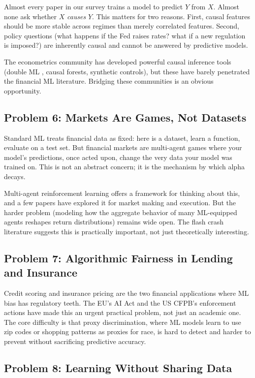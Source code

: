 Almost every paper in our survey trains a model to predict $Y$ from $X$. Almost none ask whether $X$ \textit{causes} $Y$. This matters for two reasons. First, causal features should be more stable across regimes than merely correlated features. Second, policy questions (what happens if the Fed raises rates? what if a new regulation is imposed?) are inherently causal and cannot be answered by predictive models.

The econometrics community has developed powerful causal inference tools (double ML \citep{Chernozhukov2018}, causal forests, synthetic controls), but these have barely penetrated the financial ML literature. Bridging these communities is an obvious opportunity.

\subsection{Problem 6: Markets Are Games, Not Datasets}

Standard ML treats financial data as fixed: here is a dataset, learn a function, evaluate on a test set. But financial markets are multi-agent games where your model's predictions, once acted upon, change the very data your model was trained on. This is not an abstract concern; it is the mechanism by which alpha decays.

Multi-agent reinforcement learning offers a framework for thinking about this, and a few papers have explored it for market making and execution. But the harder problem (modeling how the aggregate behavior of many ML-equipped agents reshapes return distributions) remains wide open. The flash crash literature suggests this is practically important, not just theoretically interesting.

\subsection{Problem 7: Algorithmic Fairness in Lending and Insurance}

Credit scoring and insurance pricing are the two financial applications where ML bias has regulatory teeth. The EU's AI Act and the US CFPB's enforcement actions have made this an urgent practical problem, not just an academic one. The core difficulty is that proxy discrimination, where ML models learn to use zip codes or shopping patterns as proxies for race, is hard to detect and harder to prevent without sacrificing predictive accuracy.

\subsection{Problem 8: Learning Without Sharing Data}

